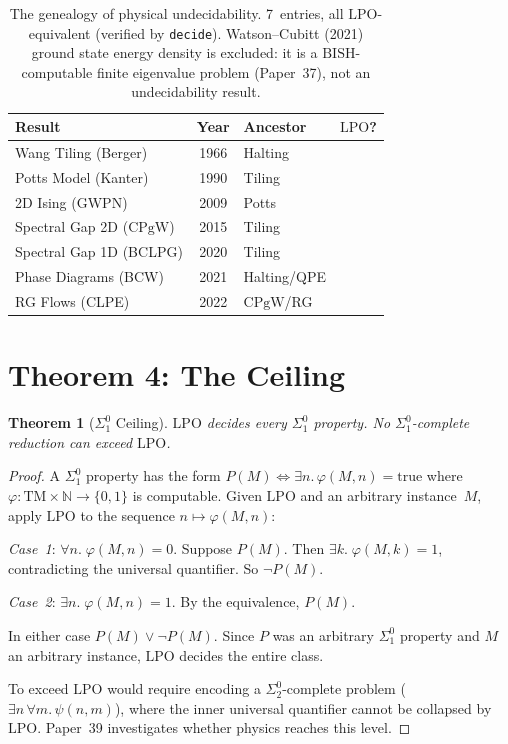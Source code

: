 \documentclass[11pt,a4paper]{article}
\theoremstyle{plain}
\newtheorem{theorem}{Theorem}[section]
\theoremstyle{definition}
\newcommand{\NN}{\mathbb{N}}
\newcommand{\LPO}{\ensuremath{\mathrm{LPO}}}
\newcommand{\BISH}{\ensuremath{\mathrm{BISH}}}
\newcommand{\CPgW}{\ensuremath{\mathrm{CPgW}}}
\newcommand{\leanok}{\textsf{\small \textcolor{green!70!black}{\checkmark}}}
\begin{document}
\begin{table}[ht]
\centering
\begin{tabular}{@{}lclc@{}}
\toprule
\textbf{Result} & \textbf{Year} & \textbf{Ancestor} & \textbf{\LPO?} \\
\midrule
Wang Tiling (Berger) & 1966 & Halting & \leanok \\
Potts Model (Kanter)~\cite{Kanter1990} & 1990 & Tiling & \leanok \\
2D Ising (GWPN)~\cite{GWPN2009} & 2009 & Potts & \leanok \\
Spectral Gap 2D (\CPgW) & 2015 & Tiling & \leanok \\
Spectral Gap 1D (BCLPG) & 2020 & Tiling & \leanok \\
Phase Diagrams (BCW) & 2021 & Halting/QPE & \leanok \\
RG Flows (CLPE) & 2022 & \CPgW/RG & \leanok \\
\bottomrule
\end{tabular}
\caption{The genealogy of physical undecidability.
  7~entries, all \LPO-equivalent (verified by \texttt{decide}).
  Watson--Cubitt (2021) ground state energy density is excluded:
  it is a $\BISH$-computable finite eigenvalue problem (Paper~37),
  not an undecidability result.}
\label{tab:genealogy}
\end{table}

\section{Theorem 4: The Ceiling}\label{sec:ceiling}

\begin{theorem}[$\Sigma_1^0$ Ceiling]\label{thm:ceiling}
\LPO{} decides every $\Sigma_1^0$ property.
No $\Sigma_1^0$-complete reduction can exceed \LPO.
\end{theorem}

\begin{proof}
A $\Sigma_1^0$ property has the form
$P(M) \Leftrightarrow \exists n.\,\varphi(M,n) = \mathrm{true}$
where $\varphi : \mathrm{TM} \times \NN \to \{0,1\}$ is computable.
Given \LPO{} and an arbitrary instance~$M$, apply \LPO{} to the
sequence $n \mapsto \varphi(M,n)$:

\emph{Case~1}: $\forall n.\; \varphi(M,n) = 0$.
Suppose $P(M)$.  Then $\exists k.\; \varphi(M,k) = 1$,
contradicting the universal quantifier.  So $\lnot P(M)$.

\emph{Case~2}: $\exists n.\; \varphi(M,n) = 1$.
By the equivalence, $P(M)$.

In either case $P(M) \lor \lnot P(M)$.
Since $P$ was an arbitrary $\Sigma_1^0$ property and $M$ an
arbitrary instance, \LPO{} decides the entire class.

To exceed \LPO{} would require encoding a $\Sigma_2^0$-complete
problem ($\exists n\,\forall m.\,\psi(n,m)$), where the inner
universal quantifier cannot be collapsed by \LPO.
Paper~39 investigates whether physics reaches this level.
\end{proof}
\end{document}
